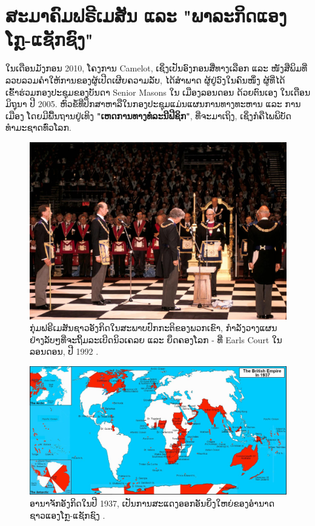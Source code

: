 \documentclass[10pt,twocolumn,letterpaper]{article}
\begin{document}
\section{ສະມາຄົມຟຣີເມສັນ ແລະ "ພາລະກິດແອງໂກຼ-ແຊັກຊົງ"}

ໃນເດືອນມັງກອນ 2010, ໂຄງການ Camelot, ເຊິ່ງເປັນອົງກອນສື່ທາງເລືອກ ແລະ ໜັງສືພິມທີ່ລວບລວມຄຳໃຫ້ການຂອງຜູ້ເປີດເຜີຍຄວາມລັບ, ໄດ້ສໍາພາດ \cite{4,6} ຜູ້ຢູ່ວົງໃນຄົນໜຶ່ງ ຜູ້ທີ່ໄດ້ເຂົ້າຮ່ວມກອງປະຊຸມຂອງບັນດາ Senior Masons ໃນ ເມືອງລອນດອນ ດ້ວຍຕົນເອງ ໃນເດືອນມິຖຸນາ ປີ 2005.
ຫົວຂໍ້ທີ່ປຶກສາຫາລືໃນກອງປະຊຸມແມ່ນແຜນການທາງທະຫານ ແລະ ການເມືອງ ໂດຍມີພື້ນຖານຢູ່ເທິງ \textbf{"ເຫດການທາງທໍລະນີຟີຊິກ"}, ທີ່ຈະມາເຖິງ, ເຊິ່ງກໍຄືໄພພິບັດທໍາມະຊາດທົ່ວໂລກ. 

\begin{figure}[b]
\begin{center}
   \includegraphics[width=1\linewidth]{freemason.jpg}
\end{center}
   \caption{ກຸ່ມຟຣີເມສັນຊາວອັງກິດໃນສະພາບປົກກະຕິຂອງພວກເຂົາ, ກຳລັງວາງແຜນຢ່າງລັບໆທີ່ຈະຖິ້ມລະເບີດນິວເຄລຍ ແລະ ຍຶດຄອງໂລກ - ທີ່ Earls Court ໃນລອນດອນ, ປີ 1992 \cite{5}.}
\label{fig:1}
\label{fig:onecol}
\end{figure}

\begin{figure}[t]
\begin{center}
\includegraphics[width=1\textwidth]{british.jpg}
\end{center}
   \caption{ອານາຈັກອັງກິດໃນປີ 1937, ເປັນການສະແດງອອກອັນຍິ່ງໃຫຍ່ຂອງອຳນາດຊາວແອງໂກຼ-ແຊັກຊົງ \cite{14}.}
   \label{fig:2}
\end{figure}
\end{document}
